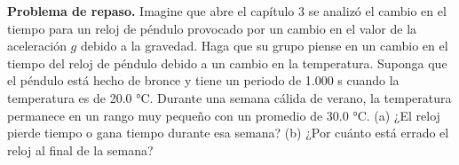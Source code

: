 \item \textbf{Problema de repaso.} Imagine que abre el capítulo 3 se analizó el cambio en el tiempo para un reloj de péndulo provocado por un cambio en el valor de la aceleración $g$ debido a la gravedad. Haga que su grupo piense en un cambio en el tiempo del reloj de péndulo debido a un cambio en la temperatura. Suponga que el péndulo está hecho de bronce y tiene un periodo de 1.000 s cuando la temperatura es de 20.0 °C. Durante una semana cálida de verano, la temperatura permanece en un rango muy pequeño con un promedio de 30.0 °C. (a) ¿El reloj pierde tiempo o gana tiempo durante esa semana? (b) ¿Por cuánto está errado el reloj al final de la semana?
